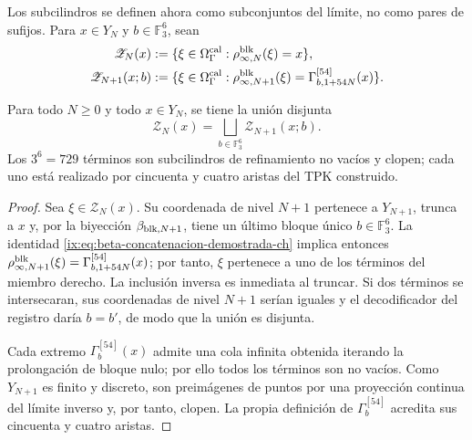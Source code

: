 Los subcilindros se definen ahora como subconjuntos del límite, no como pares
de sufijos. Para \(x\in Y_N\) y \(b\in\mathbb F_3^6\), sean
\begin{align}
 \mathscr Z_N(x)
   &:=\{\xi\in\Omega_\Gamma^{\rm cal}:
       \rho^{\rm blk}_{\infty,N}(\xi)=x\},
 \label{ix:eq:cilindro-real-limite-ch}\\
 \mathscr Z_{N+1}(x;b)
   &:=\{\xi\in\Omega_\Gamma^{\rm cal}:
       \rho^{\rm blk}_{\infty,N+1}(\xi)
       =\Gamma_{b,1+54N}^{[54]}(x)\}.
 \label{ix:eq:subcilindro-real-limite-ch}
\end{align}

\begin{theorem}
\label{ix:thm:particion-729-subcilindros-ch}
Para todo \(N\ge0\) y todo \(x\in Y_N\), se tiene la unión disjunta
\begin{equation}
 \mathscr Z_N(x)=
 \bigsqcup_{b\in\mathbb F_3^6}\mathscr Z_{N+1}(x;b).
 \label{ix:eq:particion-real-729-ch}
\end{equation}
Los \(3^6=729\) términos son subcilindros de refinamiento no vacíos y
clopen; cada uno está realizado por cincuenta y cuatro aristas del TPK
construido.
\end{theorem}

\begin{proof}
Sea \(\xi\in\mathscr Z_N(x)\). Su coordenada de nivel \(N+1\) pertenece a
\(Y_{N+1}\), trunca a \(x\) y, por la biyección
\(\beta_{{\rm blk},N+1}\), tiene un último bloque único
\(b\in\mathbb F_3^6\). La identidad
\eqref{ix:eq:beta-concatenacion-demostrada-ch} implica entonces
\(\rho^{\rm blk}_{\infty,N+1}(\xi)
=\Gamma_{b,1+54N}^{[54]}(x)\); por tanto, \(\xi\) pertenece a uno de los
términos del miembro derecho. La inclusión inversa es inmediata al truncar.
Si dos términos se intersecaran, sus coordenadas de nivel \(N+1\) serían
iguales y el decodificador del registro daría \(b=b'\), de modo que la unión
es disjunta.

Cada extremo \(\Gamma_b^{[54]}(x)\) admite una cola infinita obtenida
iterando la prolongación de bloque nulo; por ello todos los términos son no
vacíos. Como \(Y_{N+1}\) es finito y discreto, son preimágenes de puntos por
una proyección continua del límite inverso y, por tanto, clopen. La propia
definición de \(\Gamma_b^{[54]}\) acredita sus cincuenta y cuatro aristas.
\end{proof}

